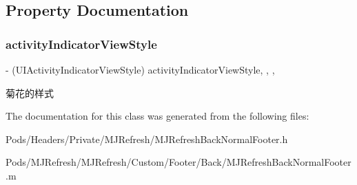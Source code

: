 \subsection{Property Documentation}
\mbox{\label{interface_m_j_refresh_back_normal_footer_a059ec7ba7f7e7c6ee520b88c24356771}} 
\subsubsection{\texorpdfstring{activity\+Indicator\+View\+Style}{activityIndicatorViewStyle}}
{\footnotesize\ttfamily -\/ (U\+I\+Activity\+Indicator\+View\+Style) activity\+Indicator\+View\+Style\hspace{0.3cm}{\ttfamily [read]}, {\ttfamily [write]}, {\ttfamily [nonatomic]}, {\ttfamily [assign]}}

菊花的样式 

The documentation for this class was generated from the following files\+:\begin{DoxyCompactItemize}
\item 
Pods/\+Headers/\+Private/\+M\+J\+Refresh/M\+J\+Refresh\+Back\+Normal\+Footer.\+h\item 
Pods/\+M\+J\+Refresh/\+M\+J\+Refresh/\+Custom/\+Footer/\+Back/M\+J\+Refresh\+Back\+Normal\+Footer.\+m\end{DoxyCompactItemize}
